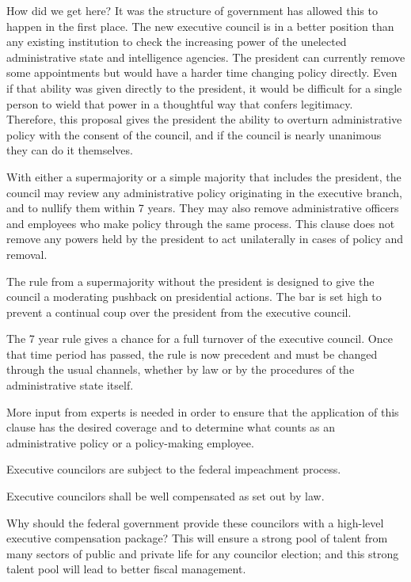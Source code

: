 \documentclass{article}
\begin{document}
How did we get here? It was the structure of government has allowed this to happen in the first place. The new executive council is in a better position than any existing institution to check the increasing power of the unelected administrative state and intelligence agencies. The president can currently remove some appointments but would have a harder time changing policy directly\cite{Fairlie}. Even if that ability was given directly to the president, it would be difficult for a single person to wield that power in a thoughtful way that confers legitimacy. Therefore, this proposal gives the president the ability to overturn administrative policy with the consent of the council, and if the council is nearly unanimous they can do it themselves.

\begin{quoting}
With either a supermajority or a simple majority that includes the president, the council may review any administrative policy originating in the executive branch, and to nullify them within 7 years. They may also remove administrative officers and employees who make policy through the same process. This clause does not remove any powers held by the president to act unilaterally in cases of policy and removal.
\end{quoting}

The rule from a supermajority without the president is designed to give the council a moderating pushback on presidential actions. The bar is set high to prevent a continual coup over the president from the executive council.

The 7 year rule gives a chance for a full turnover of the executive council. Once that time period has passed, the rule is now precedent and must be changed through the usual channels, whether by law or by the procedures of the administrative state itself.

More input from experts is needed in order to ensure that the application of this clause has the desired coverage and to determine what counts as an administrative policy or a policy-making employee.

\begin{quoting}
Executive councilors are subject to the federal impeachment process.

Executive councilors shall be well compensated as set out by law.
\end{quoting}

Why should the federal government provide these councilors with a high-level executive compensation package? This will ensure a strong pool of talent from many sectors of public and private life for any councilor election; and this strong talent pool will lead to better fiscal management.
\end{document}
